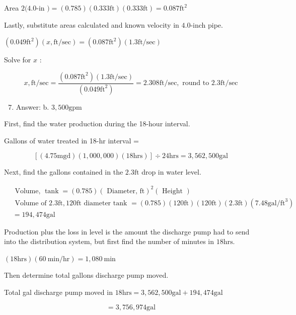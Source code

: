 \documentclass[10pt]{article}
\begin{document}
Area $2(4.0$-in $)=(0.785)(0.333 \mathrm{ft})(0.333 \mathrm{ft})=0.087 \mathrm{ft}^{2}$

Lastly, substitute areas calculated and known velocity in $4.0$-inch pipe.

$\left(0.049 \mathrm{ft}^{2}\right)(x, \mathrm{ft} / \mathrm{sec})=\left(0.087 \mathrm{ft}^{2}\right)(1.3 \mathrm{ft} / \mathrm{sec})$

Solve for $x$ :

$$
x, \mathrm{ft} / \mathrm{sec}=\frac{\left(0.087 \mathrm{ft}^{2}\right)(1.3 \mathrm{ft} / \mathrm{sec})}{\left(0.049 \mathrm{ft}^{2}\right)}=2.308 \mathrm{ft} / \mathrm{sec}, \text { round to } 2.3 \mathrm{ft} / \mathrm{sec}
$$

\begin{enumerate}
  \setcounter{enumi}{6}
  \item Answer: b. $3,500 \mathrm{gpm}$
\end{enumerate}

First, find the water production during the 18-hour interval.

Gallons of water treated in 18-hr interval =

$$
[(4.75 \mathrm{mgd})(1,000,000)(18 \mathrm{hrs})] \div 24 \mathrm{hrs}=3,562,500 \mathrm{gal}
$$

Next, find the gallons contained in the $2.3 \mathrm{ft}$ drop in water level.

$$
\begin{aligned}
& \text { Volume, } \operatorname{tank}=(0.785)(\text { Diameter, } \mathrm{ft})^{2}(\text { Height }) \\
& \text { Volume of } 2.3 \mathrm{ft}, 120 \mathrm{ft} \text { diameter tank }=(0.785)(120 \mathrm{ft})(120 \mathrm{ft})(2.3 \mathrm{ft})\left(7.48 \mathrm{gal} / \mathrm{ft}^{3}\right) \\
& =194,474 \mathrm{gal}
\end{aligned}
$$

Production plus the loss in level is the amount the discharge pump had to send into the distribution system, but first find the number of minutes in $18 \mathrm{hrs}$.

$(18 \mathrm{hrs})(60 \mathrm{~min} / \mathrm{hr})=1,080 \mathrm{~min}$

Then determine total gallons discharge pump moved.

Total gal discharge pump moved in $18 \mathrm{hrs}=3,562,500 \mathrm{gal}+194,474 \mathrm{gal}$

$$
=3,756,974 \mathrm{gal}
$$
\end{document}
